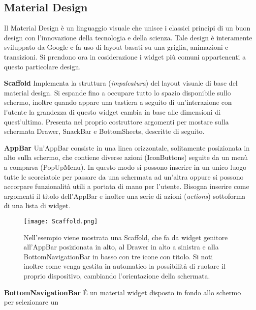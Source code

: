 	\subsection{Material Design}
	Il Material Design è un linguaggio visuale che unisce i classici principi di
	un buon design con l'innovazione della tecnologia e della scienza. 
	\cite{material} \newline
	Tale design è interamente sviluppato da Google e fa uso di layout basati su
	una griglia, animazioni e transizioni. Si prendono ora in cosiderazione i
	widget più comuni appartenenti a questo particolare design.
	\begin{trivlist}
		\item \textbf{Scaffold} \newline
		Implementa la struttura (\textit{impalcatura}) del layout visuale di
		base del material design. Si espande fino a occupare tutto lo spazio
		disponibile sullo schermo, inoltre quando appare una tastiera a seguito
		di un'interazione con l'utente la grandezza di questo widget cambia in
		base alle dimensioni di quest'ultima. Presenta nel proprio costruttore
		argomenti per mostare sulla schermata Drawer, SnackBar e BottomSheets,
		descritte di seguito. 
		\item \textbf{AppBar} \newline
		Un'AppBar consiste in una linea orizzontale, solitamente posizionata in
		alto sulla schermo, che contiene diverse azioni (IconButtons) seguite da
		un menù a comparsa (PopUpMenu). In questo modo si possono inserire in un
		unico luogo tutte le scorciatoie per passare da una schermata ad
		un'altra oppure si possono accorpare funzionalità utili a portata di
		mano per l'utente. Bisogna inserire come argomenti il titolo dell'AppBar
		e inoltre una serie di azioni (\textit{actions}) sottoforma di una lista
		di widget. 
		\begin{figure}
			\centering
			\texttt{[image: Scaffold.png]}			
			\caption{Nell'esempio viene mostrata una Scaffold, che fa da widget
			genitore all'AppBar posizionata in alto, al Drawer in alto a
			sinistra e alla BottomNavigationBar in basso con tre icone con
			titolo. Si noti inoltre come venga gestita in automatico la
			possibilità di ruotare il proprio dispositivo, cambiando
			l'orientazione della schermata.}
		\end{figure}
		\item \textbf{BottomNavigationBar} \newline
		\'E un material widget disposto in fondo allo schermo per selezionare un

\end{trivlist}

